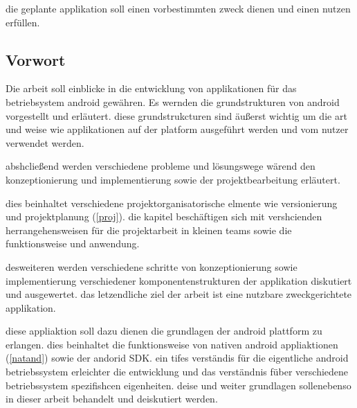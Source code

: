 die geplante applikation soll einen vorbestimmten zweck dienen und einen nutzen erfüllen.

\subsection{Vorwort}
Die arbeit soll einblicke in die entwicklung von applikationen für das betriebsystem android gewähren. Es wernden die grundstrukturen von android vorgestellt und erläutert. diese grundstrukcturen sind äußerst wichtig um die art und weise wie applikationen auf der platform ausgeführt werden und vom nutzer verwendet werden.

abshcließend werden verschiedene probleme und lösungswege wärend den konzeptionierung und implementierung sowie der projektbearbeitung erläutert.

dies beinhaltet verschiedene projektorganisatorische elmente wie versionierung und projektplanung (\ref{proj}). die kapitel beschäftigen sich mit vershcienden herrangehensweisen für die projektarbeit in kleinen teams sowie die funktionsweise und anwendung.

desweiteren werden verschiedene schritte von konzeptionierung sowie implementierung verschiedener komponentenstrukturen der applikation diskutiert und ausgewertet. das letzendliche ziel der arbeit ist eine nutzbare zweckgerichtete applikation.

diese appliaktion soll dazu dienen die grundlagen der android plattform zu erlangen. dies beinhaltet die funktionsweise von nativen android appliaktionen (\ref{natand}) sowie der andorid SDK. ein tifes verständis für die eigentliche android betriebssystem erleichter die entwicklung und das verständnis füber verschiedene betriebssystem spezifishcen eigenheiten. deise und weiter grundlagen sollenebenso in dieser arbeit behandelt und deiskutiert werden.
